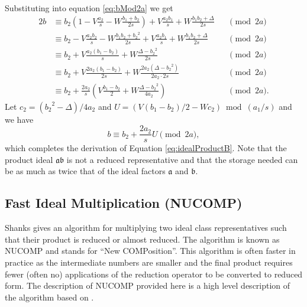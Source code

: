 \documentclass{ucalgthes1}
\theoremstyle{definition}
\begin{document}
\noindent
Substituting into equation \eqref{eq:bMod2a} we get
\begin{alignat*}{2}
	b & \equiv b_2(1-V\frac{a_2}{s} - W\frac{b_1+b_2}{2s}) + V\frac{a_2b_1}{s} + W\frac{b_1b_2 + \Delta}{2s} && \pmod{2a} \\
	& \equiv b_2 - V\frac{a_2b_2}{s} - W\frac{b_1b_2+{b_2}^2}{2s} + V\frac{a_2b_1}{s} + W\frac{b_1b_2 + \Delta}{2s} && \pmod{2a} \\
	& \equiv b_2 + V\frac{a_2(b_1-b_2)}{s} + W\frac{\Delta - {b_2}^2}{2s} && \pmod{2a} \\
	& \equiv b_2 + V\frac{2a_2(b_1-b_2)}{2s} + W\frac{2a_2(\Delta - {b_2}^2)}{2a_2 \cdot 2s} && \pmod{2a} \\
	& \equiv b_2 + \frac{2a_2}{s} \left( V\frac{b_1-b_2}{2} + W\frac{\Delta - {b_2}^2}{4a_2} \right) && \pmod{2a}.
\end{alignat*}
Let $c_2 = ({b_2}^2 - \Delta)/4a_2$ and $U = (V(b_1-b_2)/2 - Wc_2) \bmod{(a_1/s)}$ and we have
\[
	b \equiv b_2 + \frac{2a_2}{s} U \pmod{2a},
\]
which completes the derivation of Equation \ref{eq:idealProductB}.  Note that the product ideal $\mathfrak a \mathfrak b$ is not a reduced representative and that the storage needed can be as much as twice that of the ideal factors $\mathfrak a$ and $\mathfrak b$.


\subsection{Fast Ideal Multiplication (NUCOMP)}
\label{subsec:nucomp}

Shanks \cite{Shanks1989} gives an algorithm for multiplying two ideal class representatives such that their product is reduced or almost reduced.  The algorithm is known as NUCOMP and stands for ``New COMPosition''.  This algorithm is often faster in practice as the intermediate numbers are smaller and the final product requires fewer (often no) applications of the reduction operator to be converted to reduced form. The description of NUCOMP provided here is a high level description of the algorithm based on \cite[pp.119-123]{Jacobson2009}.
\end{document}
